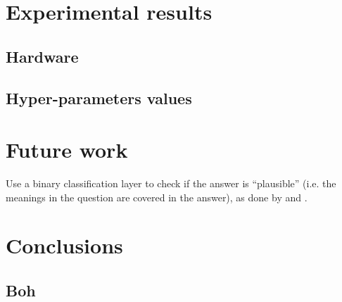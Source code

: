 \documentclass[12pt,a4paper,hidelinks]{article}
\begin{document}
\section{Experimental results}\label{sec:experimental_results}


\subsection{Hardware}


\subsection{Hyper-parameters values}

\section{Future work}\label{sec:future_work}
Use a binary classification layer to check if the answer is ``plausible'' (i.e. the meanings in the question are covered in the answer), as done by \cite{Hu2019ReadV} and \cite{Back2020NeurQuRI}.



\section{Conclusions}\label{sec:conclusions}

\subsection{Boh}



\end{document}
